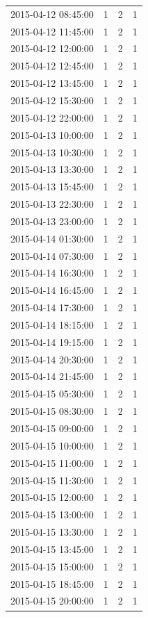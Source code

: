 \begin{tabular}{lrrr}
2015-04-12 08:45:00 & 1 & 2 & 1 \\
2015-04-12 11:45:00 & 1 & 2 & 1 \\
2015-04-12 12:00:00 & 1 & 2 & 1 \\
2015-04-12 12:45:00 & 1 & 2 & 1 \\
2015-04-12 13:45:00 & 1 & 2 & 1 \\
2015-04-12 15:30:00 & 1 & 2 & 1 \\
2015-04-12 22:00:00 & 1 & 2 & 1 \\
2015-04-13 10:00:00 & 1 & 2 & 1 \\
2015-04-13 10:30:00 & 1 & 2 & 1 \\
2015-04-13 13:30:00 & 1 & 2 & 1 \\
2015-04-13 15:45:00 & 1 & 2 & 1 \\
2015-04-13 22:30:00 & 1 & 2 & 1 \\
2015-04-13 23:00:00 & 1 & 2 & 1 \\
2015-04-14 01:30:00 & 1 & 2 & 1 \\
2015-04-14 07:30:00 & 1 & 2 & 1 \\
2015-04-14 16:30:00 & 1 & 2 & 1 \\
2015-04-14 16:45:00 & 1 & 2 & 1 \\
2015-04-14 17:30:00 & 1 & 2 & 1 \\
2015-04-14 18:15:00 & 1 & 2 & 1 \\
2015-04-14 19:15:00 & 1 & 2 & 1 \\
2015-04-14 20:30:00 & 1 & 2 & 1 \\
2015-04-14 21:45:00 & 1 & 2 & 1 \\
2015-04-15 05:30:00 & 1 & 2 & 1 \\
2015-04-15 08:30:00 & 1 & 2 & 1 \\
2015-04-15 09:00:00 & 1 & 2 & 1 \\
2015-04-15 10:00:00 & 1 & 2 & 1 \\
2015-04-15 11:00:00 & 1 & 2 & 1 \\
2015-04-15 11:30:00 & 1 & 2 & 1 \\
2015-04-15 12:00:00 & 1 & 2 & 1 \\
2015-04-15 13:00:00 & 1 & 2 & 1 \\
2015-04-15 13:30:00 & 1 & 2 & 1 \\
2015-04-15 13:45:00 & 1 & 2 & 1 \\
2015-04-15 15:00:00 & 1 & 2 & 1 \\
2015-04-15 18:45:00 & 1 & 2 & 1 \\
2015-04-15 20:00:00 & 1 & 2 & 1 \\

\end{tabular}
